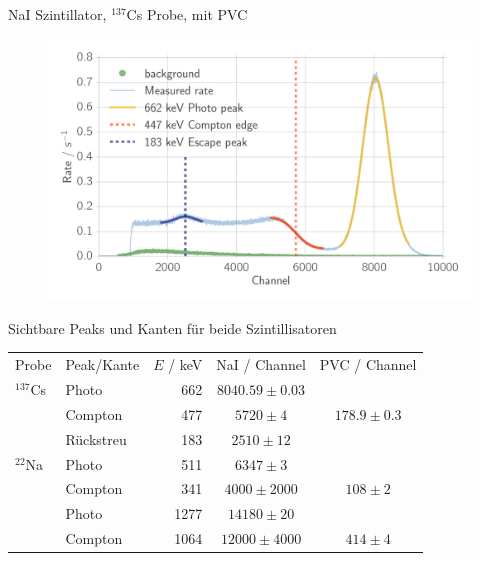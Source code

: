 \documentclass[xcolor=x11names,compress]{beamer}
\renewcommand{\(}{\begin{columns}}
\renewcommand{\)}{\end{columns}}
\newcommand{\<}[1]{\begin{column}{#1}}
\renewcommand{\>}{\end{column}}
\begin{document}
\begin{frame}[t]{NaI Szintillator, $^{137}$Cs Probe, mit PVC}
 \begin{figure}[htpb]
    \centering
    \includegraphics[width=1.0\linewidth]{../analysis/figures/histo_na_137cs}
    \label{fig:histo_na_137cs}
\end{figure}
\end{frame}

\begin{frame}[t]{Sichtbare Peaks und Kanten für beide Szintillisatoren}
\begin{table}[htpb]
    \centering
    \label{tab:mono_calibration}
    \begin{tabular}{l l r c c}

        \rowcolor{LightCyan} Probe & Peak/Kante & $E$ / keV& NaI / Channel & PVC / Channel \\
        \cellcolor{LightCyan}$^{137}$Cs & Photo & 662 & $8040.59 \pm 0.03$ &  \\
        \cellcolor{LightCyan} & Compton& 477& $5720 \pm 4$ &  $178.9 \pm 0.3$  \\
        \cellcolor{LightCyan} & Rückstreu& 183&  $2510 \pm 12$ &  \\
        \cellcolor{LightCyan}$^{22}$Na & Photo& 511& $6347 \pm 3$&  \\
        \cellcolor{LightCyan} & Compton& 341& $4000 \pm 2000$& $108 \pm 2$  \\
        \cellcolor{LightCyan} & Photo& 1277& $14180 \pm 20 $& \\
        \cellcolor{LightCyan} & Compton& 1064& $12000 \pm 4000$& $414 \pm 4$ \\
    \end{tabular}
\end{table}
\end{frame}
\end{document}
